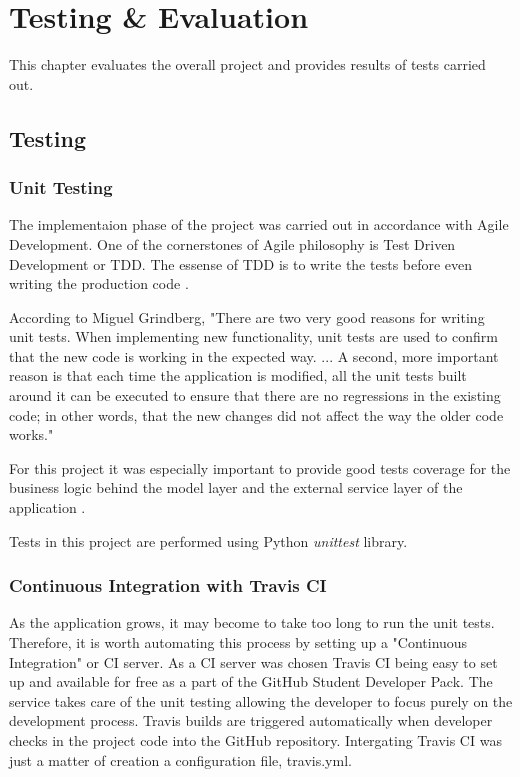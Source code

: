 \chapter{Testing \& Evaluation}\label{ch:TestAndEval}

This chapter evaluates the overall project and provides results of tests carried out.

\section{Testing}
\subsection{Unit Testing}
The implementaion phase of the project was carried out in accordance with Agile Development. One of the cornerstones of Agile philosophy is Test Driven Development or TDD. The essense of TDD is to write the tests before even writing the production code . 

According to Miguel Grindberg\citep{book:Grindberg2014FlaskWebDevelopment}, "There are two very good reasons for writing unit tests. When implementing new functionality, unit tests are used to confirm that the new code is working in the expected way. ... A second, more important reason is that each time the application is modified, all the unit tests built around it can be executed to ensure that there are no regressions  in the existing code; in other words, that the new changes did not affect the way the older code works."

 For this project it was especially important to provide good tests coverage for the business logic behind the model layer and the external service layer of the application \cite{sec:applicationarchitecture}. 

Tests in this project are performed using Python \emph{unittest} library. 

\subsection{Continuous Integration with Travis CI}
As the application grows, it may become to take too long to run the unit tests. Therefore, it is worth automating this process by setting up a "Continuous Integration" or CI server. As a CI server was chosen Travis CI being easy to set up and available for free as a part of the GitHub Student Developer Pack. 
The service takes care of the unit testing allowing the developer to focus purely on the development process. Travis builds are triggered automatically when developer checks in the project code into the GitHub repository. Intergating Travis CI was just a matter of creation a configuration file, travis.yml. 

